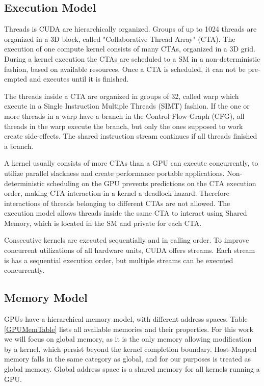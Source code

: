 \subsection{Execution Model}
Threads is CUDA are hierarchically organized. Groups of up to 1024 threads are organized in a 3D block, called "Collaborative Thread Array" (CTA). The execution of one compute kernel consists of many CTAs, organized in a 3D grid. During a kernel execution the CTAs are  scheduled to a SM in a non-deterministic fashion, based on available resources. Once a CTA is scheduled, it can not be pre-empted and executes until it is finished. \cite[2.1 - 2.2]{cuda-man}

The threads inside a CTA are organized in groups of 32, called warp which execute in a Single Instruction Multiple Threads (SIMT) fashion. If the one or more threads in a warp have a branch in the Control-Flow-Graph (CFG), all threads in the warp
execute the branch, but only the ones supposed to work create side-effects. The shared instruction stream continues if all threads finished a branch. \cite[4.1]{cuda-man}

A kernel usually consists of more CTAs than a GPU can execute concurrently, to utilize parallel slackness and create
performance portable applications.
Non-deterministic scheduling on the GPU  prevents predictions on the CTA execution order, making CTA interaction
in a kernel a deadlock hazard. Therefore interactions of threads belonging to different CTAs are not allowed. The execution model allows threads inside the same CTA to interact using Shared Memory, which is located in the SM and private for each CTA. \cite[5]{cuda-man}

Consecutive kernels are executed sequentially and in calling order. To improve concurrent utilizations of all 
hardware units, CUDA offers streams. Each stream is has a sequential execution order, but multiple streams can
be executed concurrently. \cite[5]{cuda-man}

\subsection{Memory Model}
GPUs have a hierarchical memory model, with different address spaces. Table \ref{GPUMemTable} lists all available memories and their properties. For this work we will focus on global memory, as it is the only 
memory allowing modification by a kernel, which persist beyond the kernel completion boundary.
Host-Mapped memory falls in the same category as global, and for our purposes is treated as global memory. 
Global address space is a shared memory for all kernels running a GPU.

